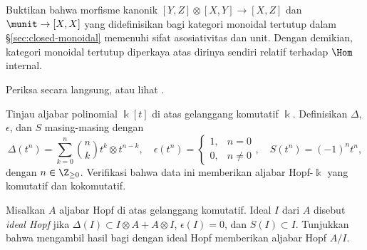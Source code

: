 
\hypertarget{o014.aljabr2.chapter7.exercises-b}{ }
	\item Buktikan bahwa morfisme kanonik
	$[Y,Z]\otimes[X,Y]\to[X,Z]$ dan $\munit\to[X,X]$ yang didefinisikan bagi
	kategori monoidal tertutup dalam \S\ref{sec:closed-monoidal} memenuhi sifat
	asosiativitas dan unit. Dengan demikian, kategori monoidal tertutup diperkaya
	atas dirinya sendiri relatif terhadap $\Hom$ internal.
	\begin{hint}
		Periksa secara langsung, atau lihat \cite[Bagian 1.6]{Kel05}.
	\end{hint}

	\item Tinjau aljabar polinomial $\Bbbk[t]$ di atas gelanggang komutatif
	$\Bbbk$. Definisikan $\Delta$, $\epsilon$, dan $S$ masing-masing dengan
	\[ \Delta(t^n) = \sum_{k=0}^n \binom{n}{k} t^k \otimes t^{n-k}, \quad \epsilon(t^n) = \begin{cases}
		1, & n = 0 \\
		0, & n \neq 0
	\end{cases}, \quad
	S(t^n) = (-1)^n t^n, \]
	dengan $n\in\Z_{\geq0}$. Verifikasi bahwa data ini memberikan
	aljabar Hopf-$\Bbbk$ yang komutatif dan kokomutatif.

	\item Misalkan $A$ aljabar Hopf di atas gelanggang komutatif. Ideal $I$ dari
	$A$ disebut \emph{ideal Hopf} jika
	$\Delta(I)\subset I\otimes A+A\otimes I$, $\epsilon(I)=0$, dan
	$S(I)\subset I$. Tunjukkan bahwa mengambil hasil bagi dengan ideal Hopf
	memberikan aljabar Hopf $A/I$.

